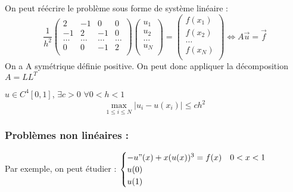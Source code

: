 \documentclass[../main.tex]{subfiles}
\begin{document}
On peut réécrire le problème sous forme de système linéaire :\\
\begin{equation}
    \frac{1}{h^2} \begin{pmatrix}
        2 & -1 & 0 & 0\\
        -1 & 2 & -1& 0 \\
        \dots & \dots & \dots & \dots\\
        0 & 0 & -1 & 2\\
    \end{pmatrix}
    \begin{pmatrix}
        u_1\\
        u_2\\
        \dots \\
        u_N\\
    \end{pmatrix} = \begin{pmatrix}
        f(x_1)\\
        f(x_2)\\
        \dots \\
        f(x_N)\\
    \end{pmatrix} \Leftrightarrow A \Vec{u} = \Vec{f}
\end{equation}
On a A symétrique définie positive. On peut donc appliquer la décomposition $A=LL^T$\\

\begin{theorem}
$u \in C^4[0,1]$, $\exists c>0$ $\forall 0<h<1$\\
\begin{equation}
    \max_{1\leq i \leq N} \lvert u_i-u(x_i)\rvert \leq ch^2
\end{equation}
\end{theorem}

\subsubsection{Problèmes non linéaires :}
Par exemple, on peut étudier : $\begin{cases}
    -u"(x) + x (u(x))^3 = f(x) & 0<x<1\\
    u(0)\\
    u(1)\\
\end{cases}$
\end{document}
